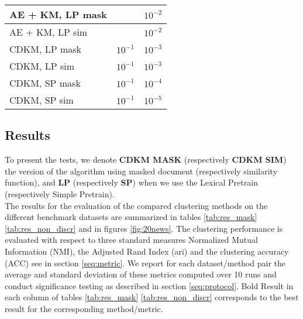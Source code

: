\begin{table}[!h]
{\begin{tabular}{|l|l|l|}
    AE + KM, LP mask  &\cellcolor{gray}  &$10^{-2}$         \\ \hline
    AE + KM, LP sim   &\cellcolor{gray}  &$10^{-2}$         \\ \hline
       CDKM, LP mask  &$10^{-1}$  &$10^{-3}$         \\ \hline
       CDKM, LP sim   &$10^{-1}$  &$10^{-3}$         \\ \hline
       CDKM, SP mask  &$10^{-1}$  &$10^{-4}$         \\ \hline
       CDKM, SP sim   &$10^{-1}$  &$10^{-5}$         \\ \hline
\end{tabular}
}
\end{table}
\subsection{\label{seq:results}Results}
To present the tests, we denote \textbf{CDKM MASK} (respectively \textbf{CDKM SIM}) the version of 
the algorithm using masked document (respectively similarity function), and \textbf{LP}
(respectively \textbf{SP}) when we use the Lexical Pretrain (respectively Simple Pretrain).
\\The results for the evaluation of the compared clustering methods on the 
different benchmark datasets are summarized in tables \ref{tab:res_mask} 
\ref{tab:res_non_discr} and in figures \ref{fig:20news}.
The clustering performance is evaluated with respect to
three standard measures Normalized Mutual Information (NMI), the Adjusted Rand 
Index (ari) and the clustering accuracy (ACC) see in section \ref{seq:metric}. 
We report for each dataset/method pair the average and standard deviation of 
these metrics computed over 10 runs and conduct significance testing as 
described in section \ref{seq:protocol}. Bold Result in each column of tables 
\ref{tab:res_mask} \ref{tab:res_non_discr} corresponds to the best result for 
the corresponding method/metric.
